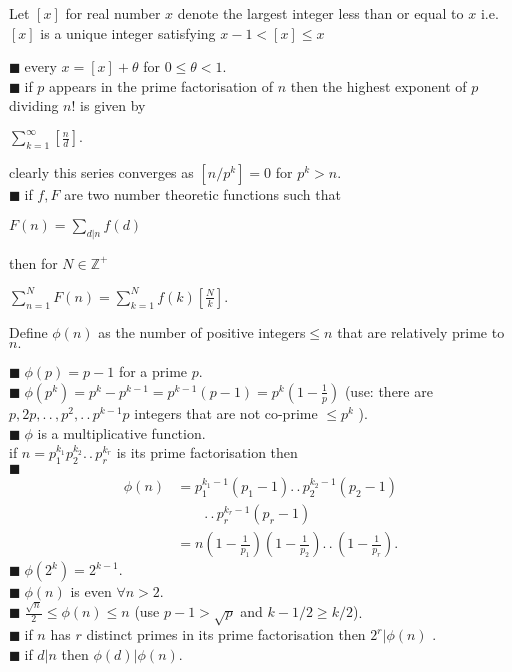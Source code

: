 \documentclass[11pt]{extarticle}
\newcommand{\Z}{\mathbb{Z}}
\newcommand{\ck}{.\,.\,}
\newcommand{\sm}[2]{\displaystyle\sum_{#1}^{#2}}
\newcommand{\snote}[1]{{\footnotesize(#1)}}
\newcommand{\tbx}[2][]{
\begin{tcolorbox}[enhanced,breakable,size=small,colback=black!2!white,title={#1},arc is angular, arc=1.5mm,
	drop fuzzy shadow]
	#2
\end{tcolorbox}
}
\newcommand{\y}{$\blacksquare\;$}
\begin{document}
\begin{multicols}{2}
\tbx[Greatest integer function]{ 
Let $ [x] $ for real number $ x $ denote the largest integer less than or equal to $ x $ i.e. $ [x] $ is a unique integer satisfying $ x-1<[x]\leq x $}
\tbx{
\y every $ x=[x]+\theta  $ for $ 0\leq \theta <1. $ \\
\y if $ p $ appears in the prime factorisation of $ n $ then the highest exponent of $ p $ dividing $ n! $ is given by 
\begin{center}
 $ \sm{k=1}{\infty}\left[\frac{ n }{d} \right]. $ 
 \end{center}
 
clearly this series converges as $ [n/p^k]=0 $ for $ p^k>n. $\\
\y if $ f,F $ are two number theoretic functions such that 

\begin{center}
 $  F(n)=\sm{d|n}{}f(d) $ 
 \end{center}

then for $ N\in \Z^+ $ 
\begin{center}
	$ \sm{n=1}{N}F(n)=\sm{k=1}{N}f(k)\left[\frac{ N }{k} \right] .$
	\end{center}  }
\tbx[Euler's $ \phi $ function]{
Define $ \phi(n) $ as the number of positive integers$\leq n $ that are relatively prime to $ n. $ }
\tbx{
\y $ \phi(p)=p-1 $ for a prime $p.  $ \\
\y $ \phi(p^k)=p^k-p^{k-1}=p^{k-1}(p-1)=p^{k}(1-\frac{ 1 }{p} ) $ \snote{use: there are $ p,2p,\ck ,p^2,\ck p^{k-1}p $ integers that are not co-prime $\leq p^{k} $ }.\\ 
 \y $ \phi $ is a multiplicative function.\\
if $ n= p_1^{k_1}p_2^{k_2}\ck p_r^{k_r}$ is its prime factorisation then \\
\y \begin{align*}
	 \phi(n)&=p_1^{k_1-1}(p_1-1) \ck p_2^{k_2-1}(p_2-1)\\
	 & \qquad \ck p_r^{k_r-1}(p_r-1) \\
	 &=n(1-\frac{ 1 }{p_1} )(1-\frac{ 1 }{p_2} )\ck (1-\frac{ 1 }{ p_r }).
\end{align*}  
\y $ \phi(2^k)=2^{k-1} .$ \\
\y $ \phi(n) $ is even $ \forall n>2. $ \\
\y $ \frac{ \sqrt{n} }{2} \leq \phi(n) \leq n$ \snote{use $ p-1>\sqrt{p} $ and $ k-1/2\geq k/2 $}. \\
\y if $ n $ has $ r $ distinct primes in its prime factorisation then $ 2^r|\phi(n) $ .\\
\y if $ d|n $ then $ \phi(d)|\phi(n). $ \\
}

\end{multicols}
\end{document}
